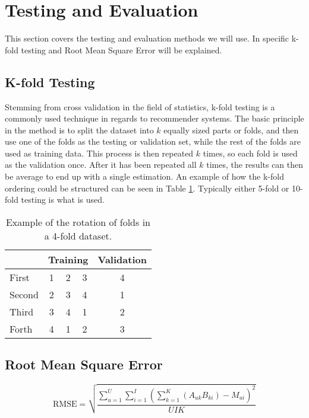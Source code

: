 \section{Testing and Evaluation}
This section covers the testing and evaluation methods we will use. In specific k-fold testing and Root Mean Square Error will be explained.

\subsection{K-fold Testing}
Stemming from cross validation in the field of statistics, k-fold testing is a commonly used technique in regards to recommender systems. The basic principle in the method is to split the dataset into $k$ equally sized parts or folds, and then use one of the folds as the testing or validation set, while the rest of the folds are used as training data. This process is then repeated $k$ times, so each fold is used as the validation once. After it has been repeated all $k$ times, the results can then be average to end up with a single estimation. An example of how the k-fold ordering could be structured can be seen in Table \ref{tbl:bg_k-fold}. Typically either 5-fold or 10-fold testing is what is used.

\begin{table}[H]
	\centering
	\begin{tabular}{|l|c|c|c|c|}
		\hline
		& \multicolumn{3}{l|}{Training} & \multicolumn{1}{l|}{Validation} \\ \hline
		First  & 1        & 2        & 3       & 4                               \\ \hline
		Second & 2        & 3        & 4       & 1                               \\ \hline
		Third  & 3        & 4        & 1       & 2                               \\ \hline
		Forth  & 4        & 1        & 2       & 3                               \\ \hline
	\end{tabular}
	\caption{Example of the rotation of folds in a 4-fold dataset.}
	\label{tbl:bg_k-fold}
\end{table}

\subsection{Root Mean Square Error}
\begin{equation}\label{eq:rmse}
	\text{RMSE} = \sqrt{\frac{\sum_{u=1}^{U}\sum_{i=1}^{I}(\sum_{k=1}^{K}(A_{uk} B_{ki}) - M_{ui})^2}{UIK}}
\end{equation}